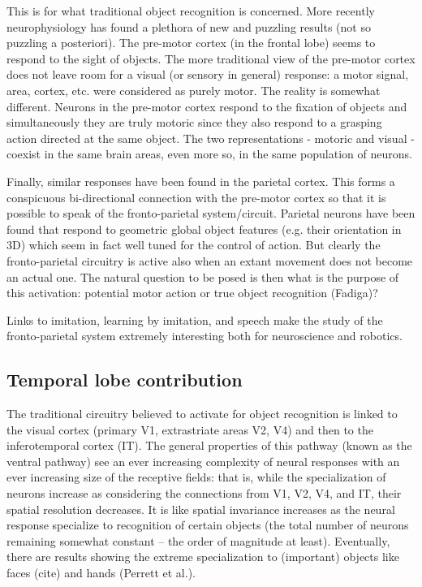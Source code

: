 This is for what traditional object recognition is concerned. More recently neurophysiology has found a plethora of new and puzzling results (not so puzzling a posteriori). The pre-motor cortex (in the frontal lobe) seems to respond to the sight of objects. The more traditional view of the pre-motor cortex does not leave room for a visual (or sensory in general) response: a motor signal, area, cortex, etc. were considered as purely motor. The reality is somewhat different. Neurons in the pre-motor cortex respond to the fixation of objects and simultaneously they are truly motoric since they also respond to a grasping action directed at the same object. The two representations - motoric and visual - coexist in the same brain areas, even more so, in the same population of neurons.

Finally, similar responses have been found in the parietal cortex. This forms a conspicuous bi-directional connection with the pre-motor cortex so that it is possible to speak of the fronto-parietal system/circuit. Parietal neurons have been found that respond to geometric global object features (e.g. their orientation in 3D) which seem in fact well tuned for the control of action. But clearly the fronto-parietal circuitry is active also when an extant movement does not become an actual one. The natural question to be posed is then what is the purpose of this activation: potential motor action or true object recognition (Fadiga)?

Links to imitation, learning by imitation, and speech make the study of the fronto-parietal system extremely interesting both for neuroscience and robotics.

\subsection{Temporal lobe contribution}

The traditional circuitry believed to activate for object recognition is linked to the visual cortex (primary V1, extrastriate areas V2, V4) and then to the inferotemporal cortex (IT). The general properties of this pathway (known as the ventral pathway) see an ever increasing complexity of neural responses with an ever increasing size of the receptive fields: that is, while the specialization of neurons increase as considering the connections from V1, V2, V4, and IT, their spatial resolution decreases. It is like spatial invariance increases as the neural response specialize to recognition of certain objects (the total number of neurons remaining somewhat constant -- the order of magnitude at least). Eventually, there are results showing the extreme specialization to (important) objects like faces (cite) and hands (Perrett et al.).

